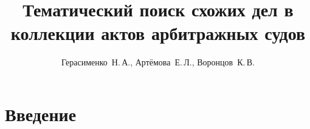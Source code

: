 \documentclass[12pt,twoside]{article}
\title
    [Тематический поиск схожих дел в коллекции актов арбитражных судов] %
    {Тематический поиск схожих дел в коллекции актов арбитражных судов}
\author
    [Герасименко~Н.\,А.] %
    {Герасименко~Н.\,А., Артёмова~Е.\,Л., Воронцов~К.\,В.} %
    [Герасименко~Н.\,А.$^1$, Артёмова~Е.\,Л.$^2$, Воронцов~К.\,В.$^3$] %
\begin{document}
\maketitle
\section{Введение}
\end{document}
